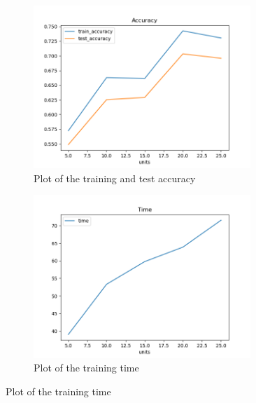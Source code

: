 \documentclass[11pt]{article}
\begin{document}
\begin{figure}[H]
  \begin{subfigure}{0.5\textwidth}
    \centering
    \includegraphics[width=0.9\textwidth]{Q2/output/c_accuracy.png}
    \caption{Plot of the training and test accuracy}
  \end{subfigure}
  \begin{subfigure}{0.5\textwidth}
    \centering
    \includegraphics[width=0.9\textwidth]{Q2/output/c_time.png}
    \caption{Plot of the training time}
  \end{subfigure}
\end{figure}
\end{document}
